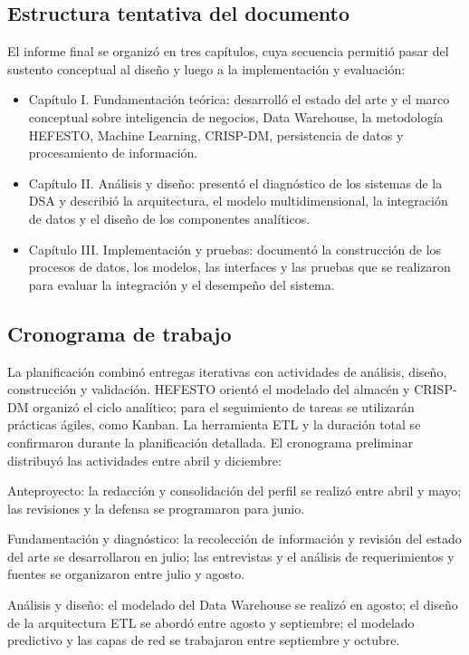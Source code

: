 \documentclass[11pt,oneside,openany]{book}
\begin{document}
\subsection*{Estructura tentativa del documento}

El informe final se organizó en tres capítulos, cuya secuencia permitió pasar del sustento conceptual al diseño y luego a la implementación y evaluación:

\begin{itemize}[leftmargin=*]
\item Capítulo I. Fundamentación teórica: desarrolló el estado del arte y el marco conceptual sobre inteligencia de negocios, Data Warehouse, la metodología HEFESTO, Machine Learning, CRISP-DM, persistencia de datos y procesamiento de información.
\item Capítulo II. Análisis y diseño: presentó el diagnóstico de los sistemas de la DSA y describió la arquitectura, el modelo multidimensional, la integración de datos y el diseño de los componentes analíticos.
\item Capítulo III. Implementación y pruebas: documentó la construcción de los procesos de datos, los modelos, las interfaces y las pruebas que se realizaron para evaluar la integración y el desempeño del sistema.
\end{itemize}
\subsection*{Cronograma de trabajo}

La planificación combinó entregas iterativas con actividades de análisis, diseño, construcción y validación. HEFESTO orientó el modelado del almacén y CRISP-DM organizó el ciclo analítico; para el seguimiento de tareas se utilizarán prácticas ágiles, como Kanban. La herramienta ETL y la duración total se confirmaron durante la planificación detallada. El cronograma preliminar distribuyó las actividades entre abril y diciembre:

Anteproyecto: la redacción y consolidación del perfil se realizó entre abril y mayo; las revisiones y la defensa se programaron para junio.

Fundamentación y diagnóstico: la recolección de información y revisión del estado del arte se desarrollaron en julio; las entrevistas y el análisis de requerimientos y fuentes se organizaron entre julio y agosto.

Análisis y diseño: el modelado del Data Warehouse se realizó en agosto; el diseño de la arquitectura ETL se abordó entre agosto y septiembre; el modelado predictivo y las capas de red se trabajaron entre septiembre y octubre.
\end{document}
